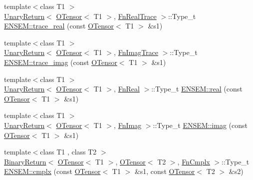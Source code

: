 \begin{DoxyCompactItemize}
\item 
{\footnotesize template$<$class T1 $>$ }\\\mbox{\hyperlink{structENSEM_1_1UnaryReturn}{Unary\+Return}}$<$ \mbox{\hyperlink{classENSEM_1_1OTensor}{O\+Tensor}}$<$ T1 $>$, \mbox{\hyperlink{structENSEM_1_1FnRealTrace}{Fn\+Real\+Trace}} $>$\+::Type\+\_\+t \mbox{\hyperlink{group__obstensor_ga540149a8c9955de22cf6c5562ec69f2f}{E\+N\+S\+E\+M\+::trace\+\_\+real}} (const \mbox{\hyperlink{classENSEM_1_1OTensor}{O\+Tensor}}$<$ T1 $>$ \&s1)
\item 
{\footnotesize template$<$class T1 $>$ }\\\mbox{\hyperlink{structENSEM_1_1UnaryReturn}{Unary\+Return}}$<$ \mbox{\hyperlink{classENSEM_1_1OTensor}{O\+Tensor}}$<$ T1 $>$, \mbox{\hyperlink{structENSEM_1_1FnImagTrace}{Fn\+Imag\+Trace}} $>$\+::Type\+\_\+t \mbox{\hyperlink{group__obstensor_gab134dab9b5acf4d2d372b22d17d4b307}{E\+N\+S\+E\+M\+::trace\+\_\+imag}} (const \mbox{\hyperlink{classENSEM_1_1OTensor}{O\+Tensor}}$<$ T1 $>$ \&s1)
\item 
{\footnotesize template$<$class T1 $>$ }\\\mbox{\hyperlink{structENSEM_1_1UnaryReturn}{Unary\+Return}}$<$ \mbox{\hyperlink{classENSEM_1_1OTensor}{O\+Tensor}}$<$ T1 $>$, \mbox{\hyperlink{structENSEM_1_1FnReal}{Fn\+Real}} $>$\+::Type\+\_\+t \mbox{\hyperlink{group__obstensor_ga6d95b4347a14db99d06a34a4aa52038b}{E\+N\+S\+E\+M\+::real}} (const \mbox{\hyperlink{classENSEM_1_1OTensor}{O\+Tensor}}$<$ T1 $>$ \&s1)
\item 
{\footnotesize template$<$class T1 $>$ }\\\mbox{\hyperlink{structENSEM_1_1UnaryReturn}{Unary\+Return}}$<$ \mbox{\hyperlink{classENSEM_1_1OTensor}{O\+Tensor}}$<$ T1 $>$, \mbox{\hyperlink{structENSEM_1_1FnImag}{Fn\+Imag}} $>$\+::Type\+\_\+t \mbox{\hyperlink{group__obstensor_ga8fd330e1f2838b575c200fc264a4d95b}{E\+N\+S\+E\+M\+::imag}} (const \mbox{\hyperlink{classENSEM_1_1OTensor}{O\+Tensor}}$<$ T1 $>$ \&s1)
\item 
{\footnotesize template$<$class T1 , class T2 $>$ }\\\mbox{\hyperlink{structENSEM_1_1BinaryReturn}{Binary\+Return}}$<$ \mbox{\hyperlink{classENSEM_1_1OTensor}{O\+Tensor}}$<$ T1 $>$, \mbox{\hyperlink{classENSEM_1_1OTensor}{O\+Tensor}}$<$ T2 $>$, \mbox{\hyperlink{structENSEM_1_1FnCmplx}{Fn\+Cmplx}} $>$\+::Type\+\_\+t \mbox{\hyperlink{group__obstensor_gaabe3804eba50d35ba93cf516f1e5a85b}{E\+N\+S\+E\+M\+::cmplx}} (const \mbox{\hyperlink{classENSEM_1_1OTensor}{O\+Tensor}}$<$ T1 $>$ \&s1, const \mbox{\hyperlink{classENSEM_1_1OTensor}{O\+Tensor}}$<$ T2 $>$ \&s2)

\end{DoxyCompactItemize}
